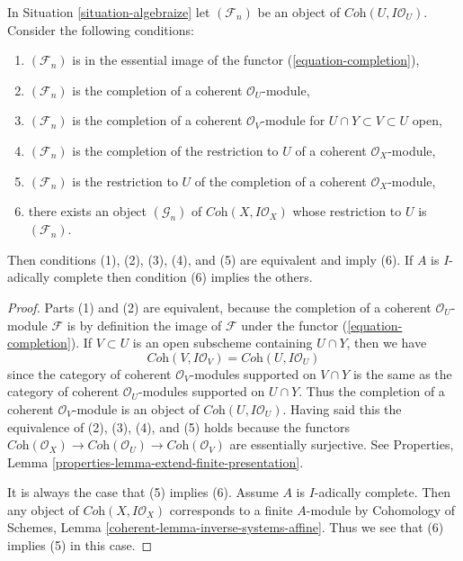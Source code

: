 \begin{lemma}
\label{lemma-essential-image-completion}
In Situation \ref{situation-algebraize} let $(\mathcal{F}_n)$
be an object of $\textit{Coh}(U, I\mathcal{O}_U)$. Consider the
following conditions:
\begin{enumerate}
\item $(\mathcal{F}_n)$ is in the essential image
of the functor (\ref{equation-completion}),
\item $(\mathcal{F}_n)$ is the completion of a
coherent $\mathcal{O}_U$-module,
\item $(\mathcal{F}_n)$ is the completion of a coherent
$\mathcal{O}_V$-module for $U \cap Y \subset V \subset U$ open,
\item $(\mathcal{F}_n)$ is the completion of
the restriction to $U$ of a coherent $\mathcal{O}_X$-module,
\item $(\mathcal{F}_n)$ is the restriction to $U$ of
the completion of a coherent $\mathcal{O}_X$-module,
\item there exists an object $(\mathcal{G}_n)$ of
$\textit{Coh}(X, I\mathcal{O}_X)$ whose restriction
to $U$ is $(\mathcal{F}_n)$.
\end{enumerate}
Then conditions (1), (2), (3), (4), and (5) are equivalent and imply (6).
If $A$ is $I$-adically complete then condition (6) implies the others.
\end{lemma}

\begin{proof}
Parts (1) and (2) are equivalent, because the completion of a coherent
$\mathcal{O}_U$-module $\mathcal{F}$ is by definition the image of
$\mathcal{F}$ under the functor (\ref{equation-completion}).
If $V \subset U$ is an open subscheme containing $U \cap Y$, then we have
$$
\textit{Coh}(V, I\mathcal{O}_V) =
\textit{Coh}(U, I\mathcal{O}_U)
$$
since the category of coherent $\mathcal{O}_V$-modules supported on
$V \cap Y$ is the same as the category of coherent $\mathcal{O}_U$-modules
supported on $U \cap Y$. Thus the completion of a coherent
$\mathcal{O}_V$-module is an object of $\textit{Coh}(U, I\mathcal{O}_U)$.
Having said this the equivalence of (2), (3), (4), and (5)
holds because the functors
$\textit{Coh}(\mathcal{O}_X) \to \textit{Coh}(\mathcal{O}_U) \to
\textit{Coh}(\mathcal{O}_V)$ are essentially surjective.
See Properties, Lemma \ref{properties-lemma-extend-finite-presentation}.

\medskip\noindent
It is always the case that (5) implies (6). Assume $A$ is $I$-adically complete.
Then any object of $\textit{Coh}(X, I\mathcal{O}_X)$ corresponds to a finite
$A$-module by Cohomology of Schemes, Lemma
\ref{coherent-lemma-inverse-systems-affine}.
Thus we see that (6) implies (5) in this case.
\end{proof}

